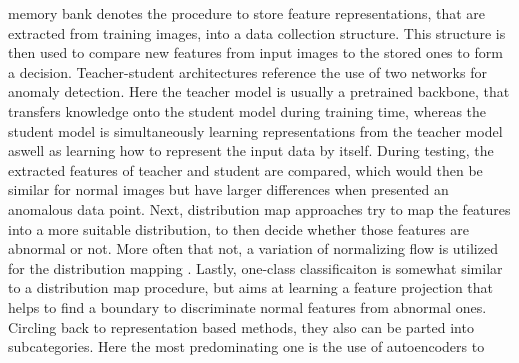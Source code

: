 memory bank denotes the procedure to store feature representations, that are extracted from training images, into a data collection structure. This structure is then used to compare new 
features from input images to the stored ones to form a decision. Teacher-student architectures reference the use of two networks for anomaly detection. Here the teacher model is usually a pretrained 
backbone, that transfers knowledge onto the student model during training time, whereas the student model is simultaneously learning representations from the teacher model aswell as learning 
how to represent the input data by itself. During testing, the extracted features of teacher and student are compared, which would then be similar for normal images but have larger differences 
when presented an anomalous data point.
Next, distribution map approaches try to map the features into a more suitable distribution, to then decide whether those features 
are abnormal or not. More often that not, a variation of normalizing flow is utilized for the distribution mapping \cite{liu2024deep}. Lastly, one-class classificaiton is 
somewhat similar to a distribution map procedure, but aims at learning a feature projection that helps to find a boundary to discriminate normal features from abnormal ones.
\newline
Circling back to representation based methods, they also can be parted into subcategories. Here the most predominating one is the use of autoencoders to 




